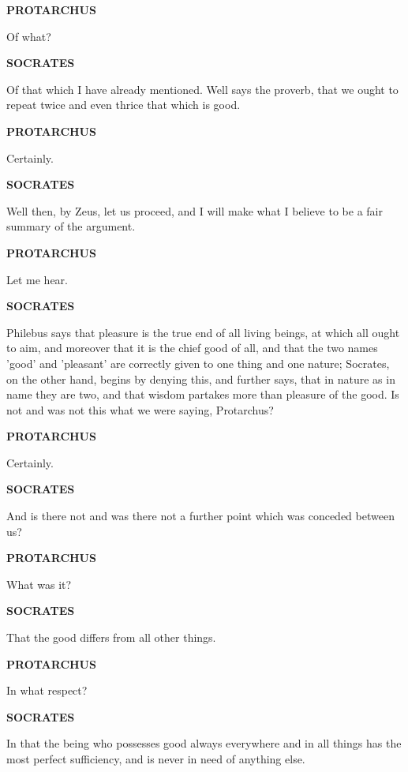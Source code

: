 \documentclass[11pt,letter]{article}
\begin{document}
\par \textbf{PROTARCHUS}
\par   Of what?

\par \textbf{SOCRATES}
\par   Of that which I have already mentioned. Well says the proverb, that we ought to repeat twice and even thrice that which is good.

\par \textbf{PROTARCHUS}
\par   Certainly.

\par \textbf{SOCRATES}
\par   Well then, by Zeus, let us proceed, and I will make what I believe to be a fair summary of the argument.

\par \textbf{PROTARCHUS}
\par   Let me hear.

\par \textbf{SOCRATES}
\par   Philebus says that pleasure is the true end of all living beings, at which all ought to aim, and moreover that it is the chief good of all, and that the two names 'good' and 'pleasant' are correctly given to one thing and one nature; Socrates, on the other hand, begins by denying this, and further says, that in nature as in name they are two, and that wisdom partakes more than pleasure of the good. Is not and was not this what we were saying, Protarchus?

\par \textbf{PROTARCHUS}
\par   Certainly.

\par \textbf{SOCRATES}
\par   And is there not and was there not a further point which was conceded between us?

\par \textbf{PROTARCHUS}
\par   What was it?

\par \textbf{SOCRATES}
\par   That the good differs from all other things.

\par \textbf{PROTARCHUS}
\par   In what respect?

\par \textbf{SOCRATES}
\par   In that the being who possesses good always everywhere and in all things has the most perfect sufficiency, and is never in need of anything else.
\end{document}
